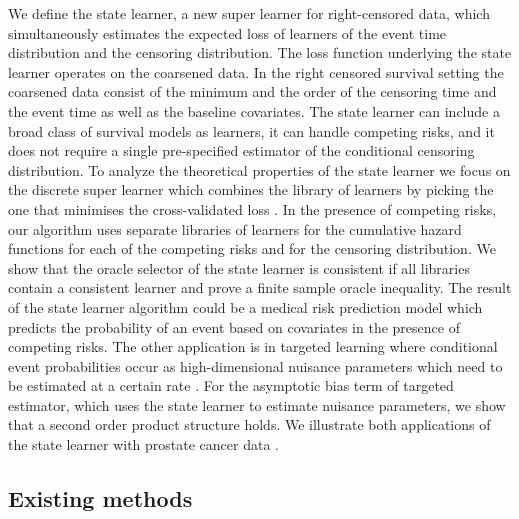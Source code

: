 \documentclass[numsec,webpdf,contemporary,medium,namedate]{oup-authoring-template}%
\theoremstyle{thmstyleone}%
\theoremstyle{thmstyletwo}%
\theoremstyle{thmstylethree}%
\newcommand{\1}{\mathds{1}}
\begin{document}
We define the state learner, a new super learner for right-censored
data, which simultaneously estimates the expected loss of learners of
the event time distribution and the censoring distribution. The loss
function underlying the state learner operates on the coarsened
data. In the right censored survival setting the coarsened data
consist of the minimum and the order of the censoring time and the
event time as well as the baseline covariates. The state learner can
include a broad class of survival models as learners, it can handle
competing risks, and it does not require a single pre-specified
estimator of the conditional censoring distribution. To analyze the
theoretical properties of the state learner we focus on the discrete
super learner which combines the library of learners by picking the
one that minimises the cross-validated loss \citep{van2007super}. In
the presence of competing risks, our algorithm uses separate libraries
of learners for the cumulative hazard functions for each of the
competing risks and for the censoring distribution. We show that the
oracle selector of the state learner is consistent if all libraries
contain a consistent learner and prove a finite sample oracle
inequality. The result of the state learner algorithm could be a
medical risk prediction model \citep{gerds2021medical} which predicts
the probability of an event based on covariates in the presence of
competing risks. The other application is in targeted learning where
conditional event probabilities occur as high-dimensional nuisance
parameters which need to be estimated at a certain rate
\citep{van2011targeted, rytgaard2021estimation, rytgaard2022targeted}.
For the asymptotic bias term of targeted estimator, which uses the
state learner to estimate nuisance parameters, we show that a second
order product structure holds. We illustrate both applications of the
state learner with prostate cancer data
\citep{kattan2000pretreatment}.

\subsection{Existing methods}
\label{sec:relat-liter-exist}
\end{document}
